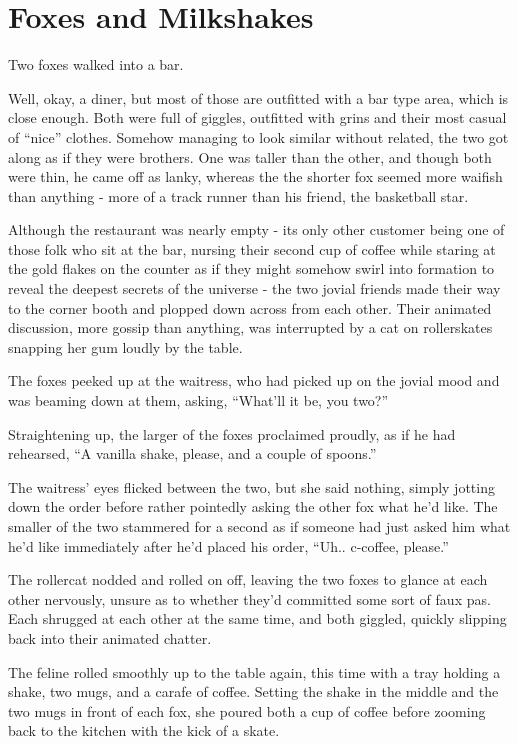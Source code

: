 \hypertarget{foxes-and-milkshakes}{%
\chapter{Foxes and Milkshakes}\label{foxes-and-milkshakes}}

Two foxes walked into a bar.

Well, okay, a diner, but most of those are outfitted with a bar type area, which is close enough. Both were full of giggles, outfitted with grins and their most casual of ``nice'' clothes. Somehow managing to look similar without related, the two got along as if they were brothers. One was taller than the other, and though both were thin, he came off as lanky, whereas the the shorter fox seemed more waifish than anything - more of a track runner than his friend, the basketball star.

Although the restaurant was nearly empty - its only other customer being one of those folk who sit at the bar, nursing their second cup of coffee while staring at the gold flakes on the counter as if they might somehow swirl into formation to reveal the deepest secrets of the universe - the two jovial friends made their way to the corner booth and plopped down across from each other. Their animated discussion, more gossip than anything, was interrupted by a cat on rollerskates snapping her gum loudly by the table.

The foxes peeked up at the waitress, who had picked up on the jovial mood and was beaming down at them, asking, ``What'll it be, you two?''

Straightening up, the larger of the foxes proclaimed proudly, as if he had rehearsed, ``A vanilla shake, please, and a couple of spoons.''

The waitress' eyes flicked between the two, but she said nothing, simply jotting down the order before rather pointedly asking the other fox what he'd like. The smaller of the two stammered for a second as if someone had just asked him what he'd like immediately after he'd placed his order, ``Uh.. c-coffee, please.''

The rollercat nodded and rolled on off, leaving the two foxes to glance at each other nervously, unsure as to whether they'd committed some sort of faux pas. Each shrugged at each other at the same time, and both giggled, quickly slipping back into their animated chatter.

The feline rolled smoothly up to the table again, this time with a tray holding a shake, two mugs, and a carafe of coffee. Setting the shake in the middle and the two mugs in front of each fox, she poured both a cup of coffee before zooming back to the kitchen with the kick of a skate.

